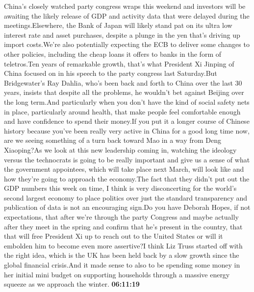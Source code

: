 \documentclass{article}%
\begin{document}
\newline%
China's closely watched party congress wraps this weekend and investors will be awaiting the likely release of GDP and activity data that were delayed during the meetings.Elsewhere, the Bank of Japan will likely stand pat on its ultra low interest rate and asset purchases, despite a plunge in the yen that's driving up import costs.We're also potentially expecting the ECB to deliver some changes to other policies, including the cheap loans it offers to banks in the form of teletros.Ten years of remarkable growth, that's what President Xi Jinping of China focused on in his speech to the party congress last Saturday.But Bridgewater's Ray Dahlia, who's been back and forth to China over the last 30 years, insists that despite all the problems, he wouldn't bet against Beijing over the long term.And particularly when you don't have the kind of social safety nets in place, particularly around health, that make people feel comfortable enough and have confidence to spend their money.If you put it a longer course of Chinese history because you've been really very active in China for a good long time now, are we seeing something of a turn back toward Mao in a way from Deng Xiaoping?As we look at this new leadership coming in, watching the ideology versus the technocrats is going to be really important and give us a sense of what the government appointees, which will take place next March, will look like and how they're going to approach the economy.The fact that they didn't put out the GDP numbers this week on time, I think is very disconcerting for the world's second largest economy to place politics over just the standard transparency and publication of data is not an encouraging sign.Do you have Deborah Hopes, if not expectations, that after we're through the party Congress and maybe actually after they meet in the spring and confirm that he's present in the country, that that will free President Xi up to reach out to the United States or will it embolden him to become even more assertive?I think Liz Truss started off with the right idea, which is the UK has been held back by a slow growth since the global financial crisis.And it made sense to also to be spending some money in her initial mini budget on supporting households through a massive energy squeeze as we approach the winter.%
\textbf{06:11:19}%
\newline%
\end{document}

